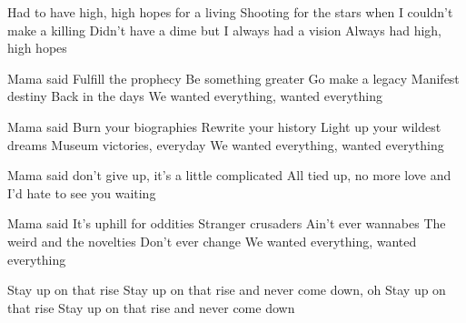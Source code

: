 \begin{chorus}
Had to have high, high hopes for a living
Shooting for the stars when I couldn't make a killing
Didn't have a dime but I always had a vision
Always had high, high hopes
\end{chorus}

\thechorus

\begin{verse*}
Mama said
Fulfill the prophecy
Be something greater
Go make a legacy
Manifest destiny
Back in the days
We wanted everything, wanted everything
\end{verse*}

\begin{verse*}
Mama said
Burn your biographies
Rewrite your history
Light up your wildest dreams
Museum victories, everyday
We wanted everything, wanted everything
\end{verse*}

\begin{prechorus}
Mama said don't give up, it's a little complicated
All tied up, no more love and I'd hate to see you waiting
\end{prechorus}

\thechorus[2]

\begin{verse*}
Mama said
It's uphill for oddities
Stranger crusaders
Ain't ever wannabes
The weird and the novelties
Don't ever change
We wanted everything, wanted everything
\end{verse*}

\begin{bridge}
Stay up on that rise
Stay up on that rise and never come down, oh
Stay up on that rise
Stay up on that rise and never come down
\end{bridge}

\theprechorus
\thechorus[4]